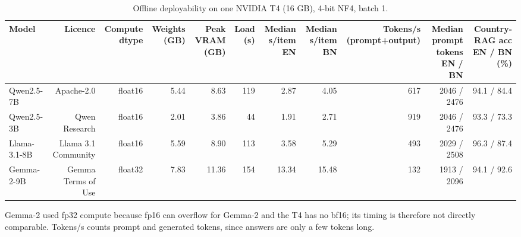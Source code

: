 \begin{table}[t]
\centering
\footnotesize
\caption{Offline deployability on one NVIDIA T4 (16 GB), 4-bit NF4, batch 1.}
\label{tab:deploy}
\begin{tabular}{lrrrrrrrrrr}
\toprule
Model & Licence & Compute dtype & Weights (GB) & Peak VRAM (GB) & Load (s) & Median s/item EN & Median s/item BN & Tokens/s (prompt+output) & Median prompt tokens EN / BN & Country-RAG acc EN / BN (\%) \\
\midrule
Qwen2.5-7B & Apache-2.0 & float16 & 5.44 & 8.63 & 119 & 2.87 & 4.05 & 617 & 2046 / 2476 & 94.1 / 84.4 \\
Qwen2.5-3B & Qwen Research & float16 & 2.01 & 3.86 & 44 & 1.91 & 2.71 & 919 & 2046 / 2476 & 93.3 / 73.3 \\
Llama-3.1-8B & Llama 3.1 Community & float16 & 5.59 & 8.90 & 113 & 3.58 & 5.29 & 493 & 2029 / 2508 & 96.3 / 87.4 \\
Gemma-2-9B & Gemma Terms of Use & float32 & 7.83 & 11.36 & 154 & 13.34 & 15.48 & 132 & 1913 / 2096 & 94.1 / 92.6 \\
\bottomrule
\end{tabular}
\par\smallskip\parbox{\linewidth}{\scriptsize Gemma-2 used fp32 compute because fp16 can overflow for Gemma-2 and the T4 has no bf16; its timing is therefore not directly comparable. Tokens/s counts prompt and generated tokens, since answers are only a few tokens long.}
\end{table}
